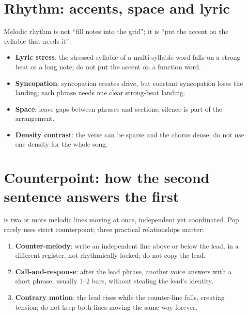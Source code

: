 \section{Rhythm: accents, space and lyric}
\label{sec:melody-rhythm}

Melodic rhythm is not ``fill notes into the grid''; it is ``put the accent on the syllable that needs it'':

\begin{itemize}
\item \textbf{Lyric stress}: the stressed syllable of a multi-syllable word falls on a strong beat or a long note; do not put the accent on a function word.
\item \textbf{Syncopation}: syncopation creates drive, but constant syncopation loses the landing; each phrase needs one clear strong-beat landing.
\item \textbf{Space}: leave gaps between phrases and sections; silence is part of the arrangement.
\item \textbf{Density contrast}: the verse can be sparse and the chorus dense; do not use one density for the whole song.
\end{itemize}

\section{Counterpoint: how the second sentence answers the first}
\label{sec:counterpoint}

 is two or more melodic lines moving at once, independent yet coordinated. Pop rarely uses strict counterpoint; three practical relationships matter:

\begin{enumerate}
\item \textbf{Counter-melody}: write an independent line above or below the lead, in a different register, not rhythmically locked; do not copy the lead.
\item \textbf{Call-and-response}: after the lead phrase, another voice answers with a short phrase, usually 1--2 bars, without stealing the lead's identity.
\item \textbf{Contrary motion}: the lead rises while the counter-line falls, creating tension; do not keep both lines moving the same way forever.
\end{enumerate}

